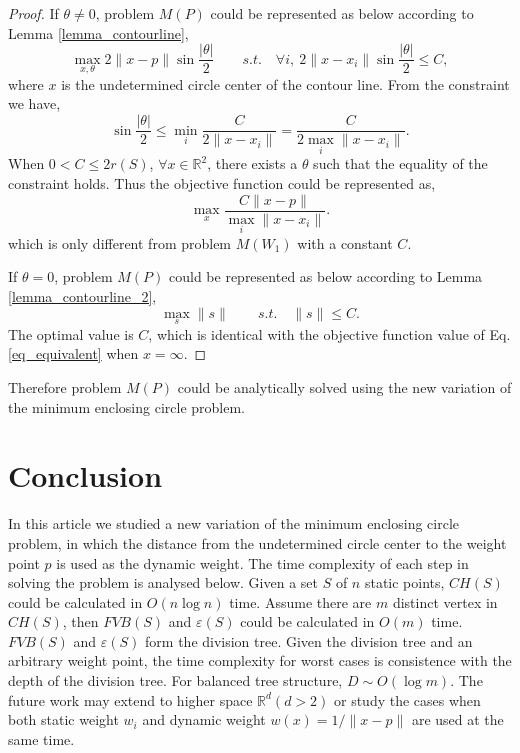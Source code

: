\documentclass[final,3p,times]{elsarticle}
\begin{document}
\begin{proof}
If $\theta\neq0$, problem $M(P)$ could be represented as below according to Lemma \ref{lemma_contourline},
\begin{equation*}
\max_{x,\theta} 2\|x-p\|\sin\frac{|\theta|}{2}  \qquad s.t. \quad \forall i,\ 2\|x-x_i\|\sin\frac{|\theta|}{2}\leq C,
\end{equation*}
where $x$ is the undetermined circle center of the contour line. From the constraint we have,
\begin{equation*}
\sin\frac{|\theta|}{2}\leq \min_{i}\frac{C}{2\|x-x_i\|} = \frac{C}{2\max_{i}\|x-x_i\|}.
\end{equation*}
When $0<C\leq 2r(S)$, $\forall x\in\mathbb{R}^2$, there exists a $\theta$ such that the equality of the constraint holds. Thus the objective function could be represented as,
\begin{equation}
\label{eq_equivalent}
\max_{x} \frac{C\|x-p\|}{\max_i \|x-x_i\|}.
\end{equation}
which is only different from problem $M(W_1)$ with a constant $C$.

If $\theta=0$, problem $M(P)$ could be represented as below according to Lemma \ref{lemma_contourline_2},
\begin{equation*}
\max_{s} \|s\| \qquad s.t. \quad \|s\|\leq C.
\end{equation*}
The optimal value is $C$, which is identical with the objective function value of Eq. \eqref{eq_equivalent} when $x=\infty$.
\end{proof}
Therefore problem $M(P)$ could be analytically solved using the new variation of the minimum enclosing circle problem.
\section{Conclusion}
In this article we studied a new variation of the minimum enclosing circle problem, in which the distance from the undetermined circle center to the weight point $p$ is used as the dynamic weight. The time complexity of each step in solving the problem is analysed below. Given a set $S$ of $n$ static points, $CH(S)$ could be calculated in $O(n\log n)$ time. Assume there are $m$ distinct vertex in $CH(S)$, then $FVB(S)$ and $\varepsilon(S)$ could be calculated in $O(m)$ time. $FVB(S)$ and $\varepsilon(S)$ form the division tree. Given the division tree and an arbitrary weight point, the time complexity for worst cases is consistence with the depth of the division tree. For balanced tree structure, $D\sim O(\log m)$. The future work may extend to higher space $\mathbb{R}^d (d>2)$ or study the cases when both static weight $w_i$ and dynamic weight $w(x)=1/\|x-p\|$ are used at the same time.
\end{document}
